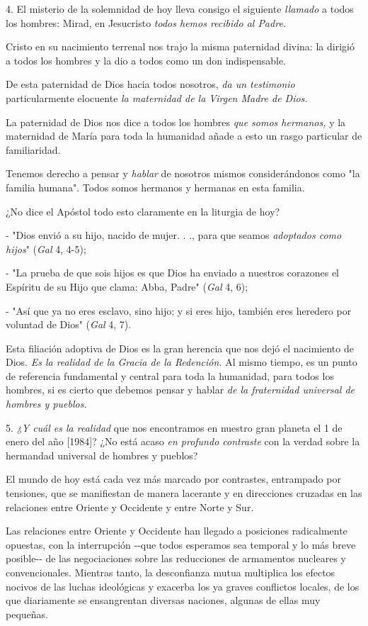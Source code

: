 \begin{body}
4. El misterio de la solemnidad de hoy lleva consigo el siguiente
\emph{llamado} a todos los hombres: Mirad, en Jesucristo \emph{todos
	hemos recibido al Padre.}

Cristo en su nacimiento terrenal nos trajo la misma paternidad divina:
la dirigió a todos los hombres y la dio a todos como un don
indispensable.

De esta paternidad de Dios hacia todos nosotros, \emph{da un testimonio}
particularmente elocuente \emph{la maternidad de la Virgen Madre de
	Dios.}

La paternidad de Dios nos dice a todos los hombres \emph{que somos
	hermanos,} y la maternidad de María para toda la humanidad añade a esto
un rasgo particular de familiaridad.

Tenemos derecho a pensar y \emph{hablar} de nosotros mismos
considerándonos como "la familia humana". Todos somos hermanos y
hermanas en esta familia.

¿No dice el Apóstol todo esto claramente en la liturgia de hoy?

- "Dios envió a su hijo, nacido de mujer. . ., para que seamos
\emph{adoptados como hijos}" (\emph{Gal} 4, 4-5);

- "La prueba de que sois hijos es que Dios ha enviado a nuestros
corazones el Espíritu de su Hijo que clama: Abba, Padre" (\emph{Gal} 4,
6);

- "Así que ya no eres esclavo, sino hijo; y si eres hijo, también eres
heredero por voluntad de Dios" (\emph{Gal} 4, 7).

Esta filiación adoptiva de Dios es la gran herencia que nos dejó el
nacimiento de Dios. \emph{Es la realidad de la Gracia de la Redención.}
Al mismo tiempo, es un punto de referencia fundamental y central para
toda la humanidad, para todos los hombres, si es cierto que debemos
pensar y hablar \emph{de la fraternidad universal de hombres y pueblos.}

5. \emph{¿Y cuál es la realidad} que nos encontramos en nuestro gran
planeta el 1 de enero del año {[}1984{]}? ¿No está acaso \emph{en
	profundo contraste} con la verdad sobre la hermandad universal de
hombres y pueblos?

El mundo de hoy está cada vez más marcado por contrastes, entrampado por
tensiones, que se manifiestan de manera lacerante y en direcciones
cruzadas en las relaciones entre Oriente y Occidente y entre Norte y
Sur.

Las relaciones entre Oriente y Occidente han llegado a posiciones
radicalmente opuestas, con la interrupción -\/-que todos esperamos sea
temporal y lo más breve posible-\/- de las negociaciones sobre las
reducciones de armamentos nucleares y convencionales. Mientras tanto, la
desconfianza mutua multiplica los efectos nocivos de las luchas
ideológicas y exacerba los ya graves conflictos locales, de los que
diariamente se ensangrentan diversas naciones, algunas de ellas muy
pequeñas.


\end{body}
